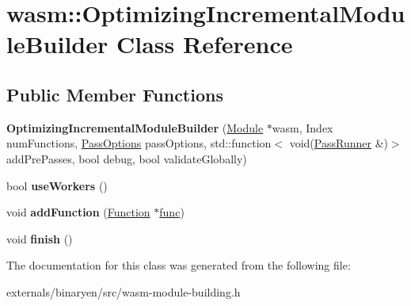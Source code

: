 \hypertarget{classwasm_1_1_optimizing_incremental_module_builder}{}\section{wasm\+:\+:Optimizing\+Incremental\+Module\+Builder Class Reference}
\label{classwasm_1_1_optimizing_incremental_module_builder}
\subsection*{Public Member Functions}
\begin{DoxyCompactItemize}
\item 
\mbox{\label{classwasm_1_1_optimizing_incremental_module_builder_a84fd938a5d66e5e9afaac7f9cc58effc}} 
{\bfseries Optimizing\+Incremental\+Module\+Builder} (\mbox{\hyperlink{classwasm_1_1_module}{Module}} $\ast$wasm, Index num\+Functions, \mbox{\hyperlink{structwasm_1_1_pass_options}{Pass\+Options}} pass\+Options, std\+::function$<$ void(\mbox{\hyperlink{structwasm_1_1_pass_runner}{Pass\+Runner}} \&)$>$ add\+Pre\+Passes, bool debug, bool validate\+Globally)
\item 
\mbox{\label{classwasm_1_1_optimizing_incremental_module_builder_aeb2c3202c2b89e3d4b41b8d6c8f3dc43}} 
bool {\bfseries use\+Workers} ()
\item 
\mbox{\label{classwasm_1_1_optimizing_incremental_module_builder_aebc8bc6eb572edf518f08e3d39a50ac0}} 
void {\bfseries add\+Function} (\mbox{\hyperlink{classwasm_1_1_function}{Function}} $\ast$\mbox{\hyperlink{structfunc}{func}})
\item 
\mbox{\label{classwasm_1_1_optimizing_incremental_module_builder_afa81404e5d0735b6ae4974f3d52316e5}} 
void {\bfseries finish} ()
\end{DoxyCompactItemize}


The documentation for this class was generated from the following file\+:\begin{DoxyCompactItemize}
\item 
externals/binaryen/src/wasm-\/module-\/building.\+h\end{DoxyCompactItemize}
